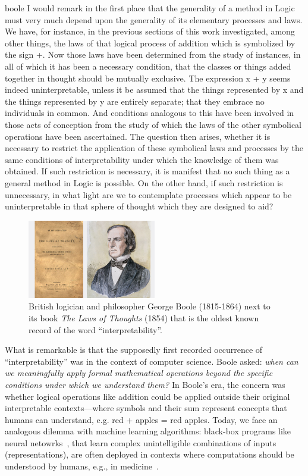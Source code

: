 \begin{displaycquote}[p.~48]{boole}
I would remark in the first place that the generality of a method in Logic
must very much depend upon the generality of its elementary processes and laws.
We have, for instance, in the previous sections of this work investigated, among
other things, the laws of that logical process of addition which is symbolized by
the sign +. Now those laws have been determined from the study of instances,
in all of which it has been a necessary condition, that the classes or things added
together in thought should be mutually exclusive. The expression x + y seems
indeed uninterpretable, unless it be assumed that the things represented by x
and the things represented by y are entirely separate; that they embrace no
individuals in common. And conditions analogous to this have been involved
in those acts of conception from the study of which the laws of the other
symbolical operations have been ascertained. The question then arises, whether
it is necessary to restrict the application of these symbolical laws and processes
by the same conditions of interpretability under which the knowledge of them
was obtained. If such restriction is necessary, it is manifest that no such thing
as a general method in Logic is possible. On the other hand, if such restriction
is unnecessary, in what light are we to contemplate processes which appear to
be uninterpretable in that sphere of thought which they are designed to aid?
\end{displaycquote}

\begin{figure}[htbp]
    \centering
    \includegraphics[width=0.5\textwidth]{images/images_intro/gboole.jpg}
    \caption{British logician and philosopher George Boole (1815-1864) next to its book \textit{The Laws of Thoughts} (1854) that is the oldest known record of the word ``interpretability''.}
    \label{fig:george-boole}
\end{figure}

What is remarkable is that the supposedly first recorded occurrence of ``interpretability'' was in the context of computer science. Boole asked: \textit{when can we meaningfully apply formal mathematical operations beyond the specific conditions under which we understand them?}
In Boole's era, the concern was whether logical operations like addition could be applied outside their original interpretable contexts—where symbols and their sum represent concepts that humans can understand, e.g. red + apples = red apples. Today, we face an analogous dilemma with machine learning algorithms: black-box programs like neural netowrks~\cite{perceptron}, that learn complex unintelligible combinations of inputs (representations), are often deployed in contexts where computations should be understood by humans, e.g., in medicine~\cite{black-box2}. 

